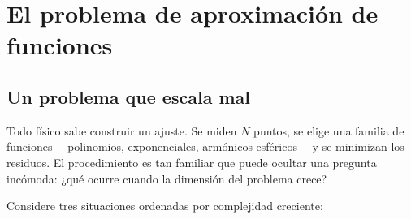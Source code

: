 
\chapter{El problema de aproximación de funciones}
\label{ch:cap1}

\section{Un problema que escala mal}
\label{sec:motivacion1}


Todo físico sabe construir un ajuste. Se miden $N$ puntos, se elige una
familia de funciones —polinomios, exponenciales, armónicos esféricos— y se
minimizan los residuos. El procedimiento es tan familiar que puede ocultar
una pregunta incómoda: ¿qué ocurre cuando la dimensión del problema crece?

Considere tres situaciones ordenadas por complejidad creciente:

